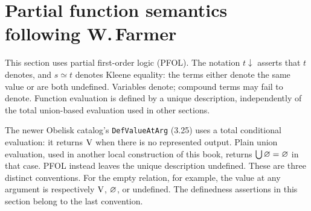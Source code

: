 \def\topic{Farmer's calculus}


\section{\texorpdfstring{Partial function semantics following W.\,Farmer}{Partial function semantics following W. Farmer}}

This section uses partial first-order logic (PFOL). The notation
$t\downarrow$ asserts that $t$ denotes, and $s\simeq t$ denotes Kleene
equality: the terms either denote the same value or are both undefined.
Variables denote; compound terms may fail to denote. Function evaluation
is defined by a unique description, independently of the total union-based
evaluation used in other sections.

\begin{note}
The newer Obelisk catalog's \texttt{DefValueAtArg} (3.25) uses a total
conditional evaluation: it returns $\mathrm{V}$ when there is no represented
output. Plain union evaluation, used in another local construction of
this book, returns $\bigcup\varnothing=\varnothing$ in that case.
PFOL instead leaves the unique description undefined. These are three
distinct conventions. For the empty relation, for example, the value at
any argument is respectively $\mathrm{V}$, $\varnothing$, or undefined.
The definedness assertions in this section belong to the last convention.
\end{note}

